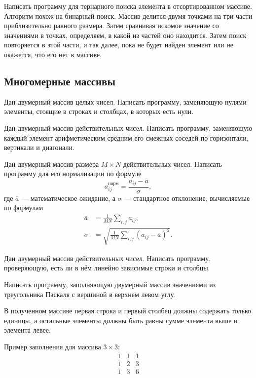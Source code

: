 \task Написать программу для тернарного поиска
элемента в отсортированном массиве. Алгоритм похож на бинарный
поиск. Массив делится двумя точками на три части приблизительно
равного размера. Затем сравнивая искомое значение со значениями в
точках, определяем, в какой из частей оно находится. Затем поиск
повторяется в этой части, и так далее, пока не будет найден элемент
или не окажется, что его нет в массиве.


\subsection{Многомерные массивы}

\task Дан двумерный массив целых чисел. Написать программу, заменяющую
нулями элементы, стоящие в строках и столбцах, в которых есть нули.

\task Дан двумерный массив действительных чисел. Написать программу,
заменяющую каждый элемент арифметическим средним его смежных соседей
по горизонтали, вертикали и диагонали.

\task Дан двумерный массив размера $M\times N$ действительных
чисел. Написать программу для его нормализации по формуле
\[
a_{ij}^\textrm{норм} = \frac{a_{ij}-\bar{a}}{\sigma},
\]
где $\bar{a}$ — математическое ожидание, а $\sigma$ — стандартное
отклонение, вычисляемые по формулам
\begin{align*}
  \bar{a} &= \frac{1}{MN}\sum_{i,j}a_{ij},\\
  \sigma  &= \sqrt{\frac{1}{MN}\sum_{i,j}(a_{ij}-\bar{a})^2}. 
\end{align*}

\task Дан двумерный массив действительных чисел. Написать программу,
проверяющую, есть ли в нём линейно зависимые строки и столбцы.

\task Написать программу, заполняющую двумерный массив значениями из
треугольника Паскаля с вершиной в верхнем
левом углу.

В полученном массиве первая строка и первый столбец должны содержать
только единицы, а остальные элементы должны быть равны сумме элемента
выше и элемента левее.

Пример заполнения для массива $3\times 3$:
\[
\begin{array}{ccc}
  1 & 1 & 1 \\
  1 & 2 & 3 \\
  1 & 3 & 6
\end{array}
\]

